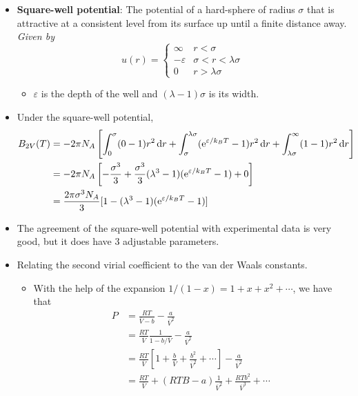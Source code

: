 \documentclass[../notes.tex]{subfiles}
\begin{document}
\begin{itemize}
    \item \textbf{Square-well potential}: The potential of a hard-sphere of radius $\sigma$ that is attractive at a consistent level from its surface up until a finite distance away. \emph{Given by}
    \begin{equation*}
        u(r) =
        \begin{cases}
            \infty & r<\sigma\\
            -\varepsilon & \sigma<r<\lambda\sigma\\
            0 & r>\lambda\sigma
        \end{cases}
    \end{equation*}
    \begin{itemize}
        \item $\varepsilon$ is the depth of the well and $(\lambda-1)\sigma$ is its width.
    \end{itemize}
    \item Under the square-well potential,
    \begin{align*}
        B_{2V}(T) &= -2\pi N_A\left[ \int_0^\sigma(0-1)r^2\dd{r}+\int_\sigma^{\lambda\sigma}(\e[\varepsilon/k_BT]-1)r^2\dd{r}+\int_{\lambda\sigma}^\infty(1-1)r^2\dd{r} \right]\\
        &= -2\pi N_A\left[ -\frac{\sigma^3}{3}+\frac{\sigma^3}{3}(\lambda^3-1)(\e[\varepsilon/k_BT]-1)+0 \right]\\
        &= \frac{2\pi\sigma^3N_A}{3}[1-(\lambda^3-1)(\e[\varepsilon/k_BT]-1)]
    \end{align*}
    \item The agreement of the square-well potential with experimental data is very good, but it does have 3 adjustable parameters.
    \item Relating the second virial coefficient to the van der Waals constants.
    \begin{itemize}
        \item With the help of the expansion $1/(1-x)=1+x+x^2+\cdots$, we have that
        \begin{align*}
            P &= \frac{RT}{\overline{V}-b}-\frac{a}{\overline{V}^2}\\
            &= \frac{RT}{\overline{V}}\frac{1}{1-b/\overline{V}}-\frac{a}{\overline{V}^2}\\
            &= \frac{RT}{\overline{V}}\left[ 1+\frac{b}{\overline{V}}+\frac{b^2}{\overline{V}^2}+\cdots \right]-\frac{a}{\overline{V}^2}\\
            &= \frac{RT}{\overline{V}}+(RTB-a)\frac{1}{\overline{V}^2}+\frac{RTb^2}{\overline{V}^3}+\cdots

\end{align*}
\end{itemize}
\end{itemize}
\end{document}
